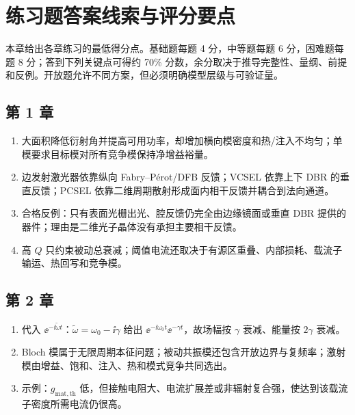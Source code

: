 \chapter{练习题答案线索与评分要点}
\label{ch:exercise-rubrics}

本章给出各章练习的最低得分点。基础题每题 4 分，中等题每题 6 分，困难题每题 8 分；答到下列关键点可得约 70\% 分数，余分取决于推导完整性、量纲、前提和反例。开放题允许不同方案，但必须明确模型层级与可验证量。

\section{第 1 章}
\begin{enumerate}
  \item 大面积降低衍射角并提高可用功率，却增加横向模密度和热/注入不均匀；单模要求目标模对所有竞争模保持净增益裕量。
  \item 边发射激光器依靠纵向 Fabry--P\'erot/DFB 反馈；VCSEL 依靠上下 DBR 的垂直反馈；PCSEL 依靠二维周期散射形成面内相干反馈并耦合到法向通道。
  \item 合格反例：只有表面光栅出光、腔反馈仍完全由边缘镜面或垂直 DBR 提供的器件；理由是二维光子晶体没有承担主要相干反馈。
  \item 高 $Q$ 只约束被动总衰减；阈值电流还取决于有源区重叠、内部损耗、载流子输运、热回写和竞争模。
\end{enumerate}

\section{第 2 章}
\begin{enumerate}
  \item 代入 $\ee^{-\ii\tilde\omega t}$：$\tilde\omega=\omega_0-\ii\gamma$ 给出 $\ee^{-\ii\omega_0t}\ee^{-\gamma t}$，故场幅按 $\gamma$ 衰减、能量按 $2\gamma$ 衰减。
  \item Bloch 模属于无限周期本征问题；被动共振模还包含开放边界与复频率；激射模由增益、饱和、注入、热和模式竞争共同选出。
  \item 示例：$g_{\mathrm{mat,th}}$ 低，但接触电阻大、电流扩展差或非辐射复合强，使达到该载流子密度所需电流仍很高。
\end{enumerate}

